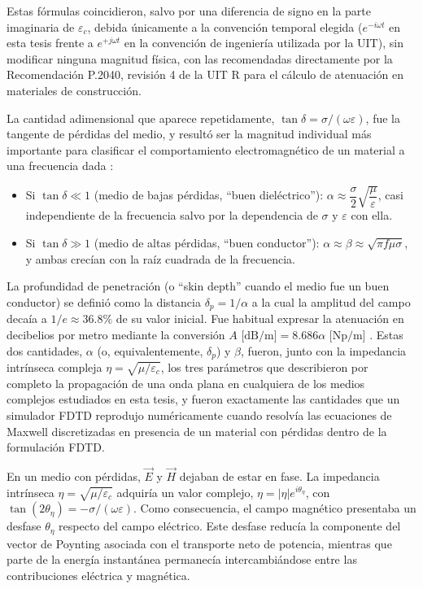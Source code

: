 Estas fórmulas coincidieron, salvo por una diferencia de signo en la parte imaginaria de $\varepsilon_c$, debida únicamente a la convención temporal elegida ($e^{-i\omega t}$ en esta tesis frente a $e^{+j\omega t}$ en la convención de ingeniería utilizada por la UIT), sin modificar ninguna magnitud física, con las recomendadas directamente por la Recomendación P.2040, revisión 4 de la UIT R \cite{ITU2025} para el cálculo de atenuación en materiales de construcción.

La cantidad adimensional que aparece repetidamente, $\tan\delta = \sigma/(\omega\varepsilon)$, fue la tangente de pérdidas del medio, y resultó ser la magnitud individual más importante para clasificar el comportamiento electromagnético de un material a una frecuencia dada \cite{ITU2025}:
\begin{itemize}
    \item Si $\tan\delta \ll 1$ (medio de bajas pérdidas, ``buen dieléctrico''): $\alpha \approx \dfrac{\sigma}{2}\sqrt{\dfrac{\mu}{\varepsilon}}$, casi independiente de la frecuencia salvo por la dependencia de $\sigma$ y $\varepsilon$ con ella.
    \item Si $\tan\delta \gg 1$ (medio de altas pérdidas, ``buen conductor''): $\alpha\approx\beta\approx\sqrt{\pi f\mu\sigma}$, y ambas crecían con la raíz cuadrada de la frecuencia.
\end{itemize}

La profundidad de penetración (o ``skin depth'' cuando el medio fue un buen conductor) se definió como la distancia $\delta_p=1/\alpha$ a la cual la amplitud del campo decaía a $1/e\approx 36.8\%$ de su valor inicial. Fue habitual expresar la atenuación en decibelios por metro mediante la conversión $A\text{ [dB/m]} = 8.686\alpha\text{ [Np/m]}$ \cite[ec.~26]{ITU2025}. Estas dos cantidades, $\alpha$ (o, equivalentemente, $\delta_p$) y $\beta$, fueron, junto con la impedancia intrínseca compleja $\eta=\sqrt{\mu/\varepsilon_c}$, los tres parámetros que describieron por completo la propagación de una onda plana en cualquiera de los medios complejos estudiados en esta tesis, y fueron exactamente las cantidades que un simulador FDTD reprodujo numéricamente cuando resolvía las ecuaciones de Maxwell discretizadas en presencia de un material con pérdidas dentro de la formulación FDTD.

En un medio con pérdidas, $\vec{E}$ y $\vec{H}$ dejaban de estar en fase. La impedancia intrínseca $\eta=\sqrt{\mu/\varepsilon_c}$ adquiría un valor complejo, $\eta=|\eta|e^{i\theta_\eta}$, con $\tan(2\theta_\eta)=-\sigma/(\omega\varepsilon)$. Como consecuencia, el campo magnético presentaba un desfase $\theta_\eta$ respecto del campo eléctrico. Este desfase reducía la componente del vector de Poynting asociada con el transporte neto de potencia, mientras que parte de la energía instantánea permanecía intercambiándose entre las contribuciones eléctrica y magnética.

